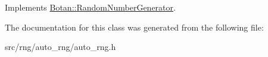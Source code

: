 Implements \hyperlink{classBotan_1_1RandomNumberGenerator_a2d4e91943829d64593ee4ce4251fd57b}{Botan\-::\-Random\-Number\-Generator}.



The documentation for this class was generated from the following file\-:\begin{DoxyCompactItemize}
\item 
src/rng/auto\-\_\-rng/auto\-\_\-rng.\-h\end{DoxyCompactItemize}
